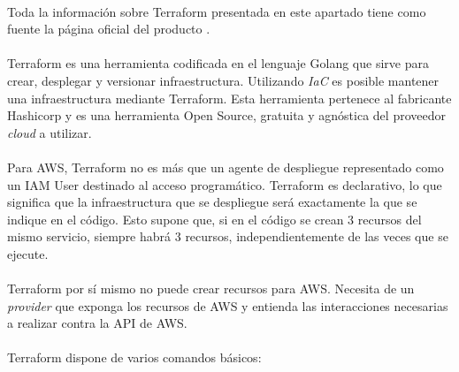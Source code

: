 \documentclass[../../memoria.tex]{subfiles}
\begin{document}
\paragraph{}
Toda la información sobre Terraform presentada en este apartado tiene como fuente la página oficial del producto \cite{terraform}.

\paragraph{}
Terraform es una herramienta codificada en el lenguaje Golang que sirve para crear, desplegar y versionar infraestructura. Utilizando \textit{IaC} es posible mantener una infraestructura mediante Terraform. Esta herramienta pertenece al fabricante Hashicorp y es una herramienta Open Source, gratuita y agnóstica del proveedor \textit{cloud} a utilizar.

\paragraph{}
Para AWS, Terraform no es más que un agente de despliegue representado como un IAM User destinado al acceso programático. Terraform es declarativo, lo que significa que la infraestructura que se despliegue será exactamente la que se indique en el código. Esto supone que, si en el código se crean 3 recursos del mismo servicio, siempre habrá 3 recursos, independientemente de las veces que se ejecute.

\paragraph{}
Terraform por sí mismo no puede crear recursos para AWS. Necesita de un \textit{provider} que exponga los recursos de AWS y entienda las interacciones necesarias a realizar contra la API de AWS.

\paragraph{}
Terraform dispone de varios comandos básicos:
\end{document}
